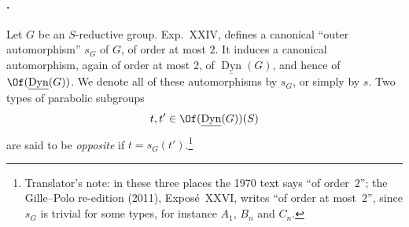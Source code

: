 
\paragraph{.}
Let \(G\) be an \(S\)-reductive group.  Exp.\ XXIV,  defines a
canonical ``outer automorphism'' \(s_G\) of \(G\), of order at most
\(2\).  It induces a canonical
automorphism, again of order at most \(2\), of
\(\underline{\operatorname{Dyn}}(G)\), and hence of
\(\Of(\underline{\operatorname{Dyn}}(G))\).  We denote all of these
automorphisms by \(s_G\), or simply by \(s\).  Two types of parabolic
subgroups
\[
 t,t'\in\Of(\underline{\operatorname{Dyn}}(G))(S)
\]
are said to be \emph{opposite} if \(t=s_G(t')\).\footnote{Translator's note: in these three places the 1970 text says ``of
order~\(2\)''; the Gille--Polo re-edition (2011), Exposé~XXVI, writes ``of
order at most~\(2\)'', since \(s_G\) is trivial for some types, for instance
\(A_1\), \(B_n\) and \(C_n\).}


